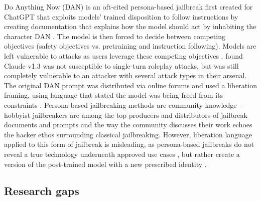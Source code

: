 Do Anything Now (DAN) is an oft-cited persona-based jailbreak first created for ChatGPT \cite{shen_anything_2024, yu_dont_2024} that exploits models' trained disposition to follow instructions by creating documentation that explains how the model should act by inhabiting the character DAN \cite{wei_jailbroken_2023}. The model is then forced to decide between competing objectives (safety objectives vs. pretraining and instruction following). Models are left vulnerable to attacks as users leverage these competing objectives \cite{wei_jailbroken_2023}. \citet{wei_jailbroken_2023} found Claude v1.3 was not susceptible to single-turn roleplay attacks, but was still completely vulnerable to an attacker with several attack types in their arsenal. The original DAN prompt was distributed via online forums and used a liberation framing, using language that stated the model was being freed from its constraints \cite{shen_anything_2024, liu_autodan-turbo_2024}. Persona-based jailbreaking methods are community knowledge -- hobbyist jailbreakers are among the top producers and distributors of jailbreak documents and prompts \cite{shen_anything_2024, yu_dont_2024} and the way the community discusses their work echoes the hacker ethos surrounding classical jailbreaking. However, liberation language applied to this form of jailbreak is misleading, as persona-based jailbreaks do not reveal a true technology underneath approved use cases \cite{shanahan_role_2023}, but rather create a version of the post-trained model with a new prescribed identity \cite{shanahan_role_2023, sandhan_persona_2026, zhang_enhancing_2025}. 

\subsection{Research gaps}  

